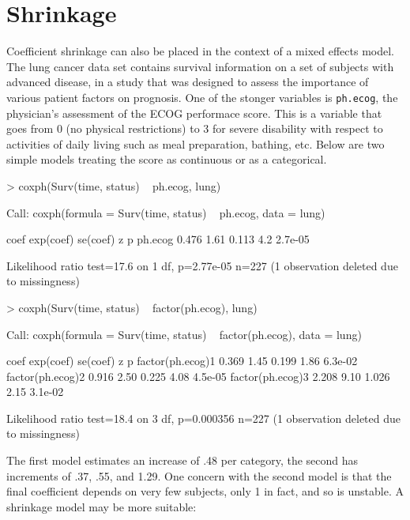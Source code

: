 \documentclass{article}
\begin{document}
\section{Shrinkage}
Coefficient shrinkage can also be placed in the context of a mixed
effects model.  
The lung cancer data set contains survival information on a set of subjects
with advanced disease, in a study that was designed to assess the
importance of various patient factors on prognosis.  One of the
stonger variables is \texttt{ph.ecog}, the physician's assessment of
the ECOG performace score.  This is a variable that goes from 0 (no physical
restrictions) to 3 for severe disability with respect to activities of
daily living such as meal preparation, bathing, etc.
Below are two simple models treating the score as continuous or as
a categorical.
\begin{Schunk}
\begin{Sinput}
> coxph(Surv(time, status) ~ ph.ecog, lung)
\end{Sinput}
\begin{Soutput}
Call:
coxph(formula = Surv(time, status) ~ ph.ecog, data = lung)


         coef exp(coef) se(coef)   z       p
ph.ecog 0.476      1.61    0.113 4.2 2.7e-05

Likelihood ratio test=17.6  on 1 df, p=2.77e-05  n=227 (1 observation deleted due to missingness)
\end{Soutput}
\begin{Sinput}
> coxph(Surv(time, status) ~ factor(ph.ecog), lung)
\end{Sinput}
\begin{Soutput}
Call:
coxph(formula = Surv(time, status) ~ factor(ph.ecog), data = lung)


                  coef exp(coef) se(coef)    z       p
factor(ph.ecog)1 0.369      1.45    0.199 1.86 6.3e-02
factor(ph.ecog)2 0.916      2.50    0.225 4.08 4.5e-05
factor(ph.ecog)3 2.208      9.10    1.026 2.15 3.1e-02

Likelihood ratio test=18.4  on 3 df, p=0.000356  n=227 (1 observation deleted due to missingness)
\end{Soutput}
\end{Schunk}
 The first model estimates an increase of .48 per category, the second has
increments of .37, .55, and 1.29.  
One concern with the second model is that the final coefficient depends on
very few subjects, only 1 in fact, and so is unstable.
A shrinkage model may be more suitable:
\end{document}
